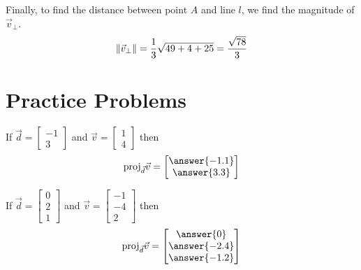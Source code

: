 \documentclass{ximera}
\begin{document}
\begin{example}
\begin{explanation}
    \begin{center}
    \end{center}
     
     
    Finally, to find the distance between point $A$ and line $l$, we find the magnitude of $\vec{v}_{\perp}$.
    $$\left\|\vec{v}_{\perp}\right\|=\frac{1}{3}\sqrt{49+4+25}=\frac{\sqrt{78}}{3}$$
    \end{explanation}
    \end{example}
     
    \section*{Practice Problems}
     
      \begin{problem}\label{prob:proj1a}
      If $\vec{d}=\begin{bmatrix}-1\\3\end{bmatrix}$ and $\vec{v}=\begin{bmatrix}1\\4\end{bmatrix}$ then
      $$\mbox{proj}_{\vec{d}}\vec{v}=\begin{bmatrix}\answer{-1.1}\\\answer{3.3}\end{bmatrix}$$
        \end{problem}
         
        \begin{problem}\label{prob:proj1b}
        If $\vec{d}=\begin{bmatrix}0\\2\\1\end{bmatrix}$ and $\vec{v}=\begin{bmatrix}-1\\-4\\2\end{bmatrix}$ then
        $$\mbox{proj}_{\vec{d}}\vec{v}=\begin{bmatrix}\answer{0}\\\answer{-2.4}\\\answer{-1.2}\end{bmatrix}$$
        \end{problem}
     
\end{document}
